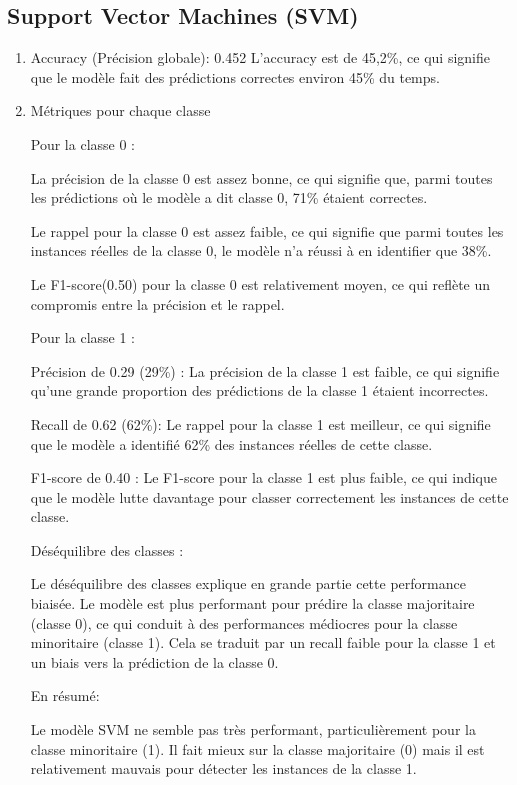 \subsection{Support Vector Machines (SVM)}
\begin{flushleft}
\begin{enumerate}
\item Accuracy (Précision globale): 0.452
L'accuracy est de 45,2\%, ce qui signifie que le modèle fait des prédictions correctes environ 45\% du temps.

\item Métriques pour chaque classe

Pour la classe 0 :

La précision de la classe 0 est assez bonne, ce qui signifie que, parmi toutes les prédictions où le modèle a dit classe 0, 71\% étaient correctes.

Le rappel pour la classe 0 est assez faible, ce qui signifie que parmi toutes les instances réelles de la classe 0, le modèle n'a réussi à en identifier que 38\%.

Le F1-score(0.50) pour la classe 0 est relativement moyen, ce qui reflète un compromis entre la précision et le rappel.

Pour la classe 1 :

Précision de  0.29 (29\%) : La précision de la classe 1 est faible, ce qui signifie qu'une grande proportion des prédictions de la classe 1 étaient incorrectes.


Recall de  0.62 (62\%): Le rappel pour la classe 1 est meilleur, ce qui signifie que le modèle a identifié 62\% des instances réelles de cette classe.

F1-score de 0.40 : Le F1-score pour la classe 1 est plus faible, ce qui indique que le modèle lutte davantage pour classer correctement les instances de cette classe.

Déséquilibre des classes :

Le déséquilibre des classes explique en grande partie cette performance biaisée. Le modèle est plus performant pour prédire la classe majoritaire (classe 0), ce qui conduit à des performances médiocres pour la classe minoritaire (classe 1). Cela se traduit par un recall faible pour la classe 1 et un biais vers la prédiction de la classe 0.

En résumé:

Le modèle SVM ne semble pas très performant, particulièrement pour la classe minoritaire (1). Il fait mieux sur la classe majoritaire (0) mais il est relativement mauvais pour détecter les instances de la classe 1.
\end{enumerate}
\end{flushleft}

